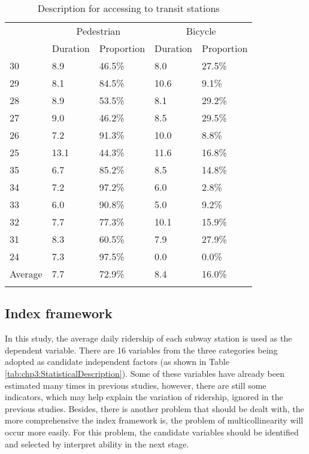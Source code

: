 \begin{table}[htbp]
	\centering
	\caption{Description for accessing to transit stations}
	\label{tab:chp3:AccessToStations}%
	\small
	\renewcommand{\arraystretch}{1.25} %
	
	\begin{tabular}{p{3em}<{\centering}p{5em}<{\raggedleft}p{5em}<{\raggedleft}p{5em}<{\raggedleft}p{5em}<{\raggedleft}}
	
		\Xhline{1.5pt}
		\multirow{2}{3em}{\centering{Station No.}} & \multicolumn{2}{c}{Pedestrian} & \multicolumn{2}{c}{Bicycle} \\
		& Duration & Proportion & Duration & Proportion \\
		
		\midrule
		30 & 8.9 & 46.5\% & 8.0 & 27.5\% \\
		29 & 8.1 & 84.5\% & 10.6 & 9.1\% \\
		28 & 8.9 & 53.5\% & 8.1 & 29.2\%\\
		27 & 9.0 & 46.2\% & 8.5 & 29.5\% \\
		26 & 7.2 & 91.3\% & 10.0 & 8.8\% \\
		25 & 13.1 & 44.3\% & 11.6 & 16.8\% \\
		35 & 6.7 & 85.2\% & 8.5 & 14.8\% \\
		34 & 7.2 & 97.2\% & 6.0 & 2.8\% \\
		33 & 6.0 & 90.8\% & 5.0 & 9.2\% \\
		32 & 7.7 & 77.3\% & 10.1 & 15.9\% \\
		31 & 8.3 & 60.5\% & 7.9 & 27.9\% \\
		24 & 7.3 & 97.5\% & 0.0 & 0.0\% \\
		
		\rowcolor[rgb]{.8, .8, .8}
		Average & 7.7 & 72.9\% & 8.4 & 16.0\% \\
		
		\Xhline{1.5pt}
	\end{tabular}%

\end{table}%

%
\subsection{Index framework}
%
In this study, the average daily ridership of each subway station is used as the dependent variable. There are 16 variables from the three categories being adopted as candidate independent factors (as shown in Table \ref{tab:chp3:StatisticalDescription}). Some of these variables have already been estimated many times in previous studies, however, there are still some indicators, which may help explain the variation of ridership, ignored in the previous studies. Besides, there is another problem that should be dealt with, the more comprehensive the index framework is, the problem of multicollinearity will occur more easily. For this problem, the candidate variables should be identified and selected by interpret ability in the next stage.

